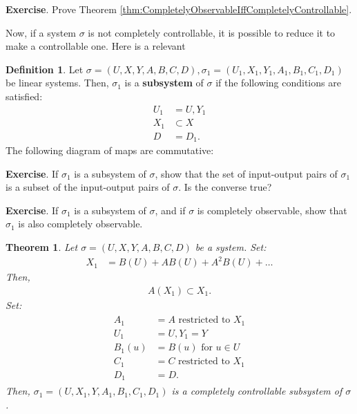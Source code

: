 \documentclass[12pt]{book}
\theoremstyle{plain}
\newtheorem{theorem}{Theorem}[section]
\theoremstyle{definition}
\newtheorem{definition}{Definition}[section]
\begin{document}
\textbf{Exercise}.
Prove Theorem \ref{thm:CompletelyObservableIffCompletelyControllable}.

Now, if a system $\sigma$ is not completely controllable, it is possible to reduce it to make a controllable one.
Here is a relevant

\begin{definition}
    Let $\sigma = (U, X, Y, A, B, C, D), \sigma_1 = (U_1, X_1, Y_1, A_1, B_1, C_1, D_1)$ be linear systems.
    Then, $\sigma_1$ is a \textbf{subsystem} of $\sigma$ if the following conditions are satisfied:
    \begin{align}
        U_1 &= U, Y_1 \\
        X_1 &\subset X \\
        D &= D_1.
    \end{align}
    The following diagram of maps are commutative:
\end{definition}

\textbf{Exercise}.
If $\sigma_1$ is a subsystem of $\sigma$, show that the set of input-output pairs of $\sigma_1$ is a subset of the input-output pairs of $\sigma$.
Is the converse true?

\textbf{Exercise}.
If $\sigma_1$ is a subsystem of $\sigma$, and if $\sigma$ is completely observable, show that $\sigma_1$ is also completely observable.

\begin{theorem} \label{thm:CompletelyControllableSubsystem}
    Let $\sigma = (U, X, Y, A, B, C, D)$ be a system.
    Set:
    \begin{align} \label{eq:X_1=B(U)+AB(U)+A^2B(U)+...}
        X_1 &= B(U) + AB(U) + A^2B(U) + \dots
    \end{align}
    Then,
    \begin{align} \label{eq:A(X_1)subsetX_1}
        A(X_1) \subset X_1.
    \end{align}
    Set:
    \begin{align*}
    \begin{split}
        A_1 &= A \text{ restricted to } X_1 \\
        U_1 &= U, Y_1 = Y \\
        B_1(u) &= B(u) \text{ for } u \in U \\
        C_1 &= C \text{ restricted to } X_1 \\
        D_1 &= D.
    \end{split}
    \end{align*}
    Then, $\sigma_1 = (U, X_1, Y, A_1, B_1, C_1, D_1)$ is a completely controllable subsystem of $\sigma$.
\end{theorem}
\end{document}
